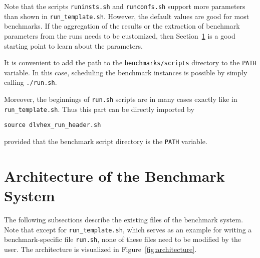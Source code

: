 \documentclass[a4paper]{article}
\begin{document}
		Note that the scripts {\tt runinsts.sh} and {\tt runconfs.sh} support more
		parameters than shown in {\tt run\_template.sh}.
		However, the default values are good for most benchmarks.
		If the aggregation of the results or
		the extraction of benchmark parameters from the runs needs to be customized,
		then Section~\ref{sec:architecture} is a good starting point to learn about the parameters.
		
		It is convenient to add the path to the {\tt benchmarks/scripts} directory to the {\tt PATH} variable.
		In this case, scheduling the benchmark instances is possible by simply calling {\tt ./run.sh}.
		
		Moreover, the beginnings of {\tt run.sh} scripts are in many cases exactly
		like in {\tt run\_template.sh}. Thus this part can be directly imported by
		\begin{center}
			{\tt source dlvhex\_run\_header.sh}
		\end{center}
		provided that the benchmark script directory is the {\tt PATH} variable.
			
	\section{Architecture of the Benchmark System}
	\label{sec:architecture}
			
		The following subsections describe the existing files of the benchmark system.
		Note that except for {\tt run\_template.sh}, which serves as an example
		for writing a benchmark-specific file {\tt run.sh}, none of these files need
		to be modified by the user.
		The architecture is visualized in Figure~\ref{fig:architecture}.
		
\end{document}
